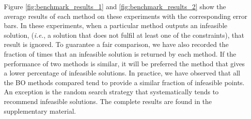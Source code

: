 \documentclass[review,preprint,12pt]{elsarticle}
\begin{document}
Figure \ref{fig:benchmark_results_1} and \ref{fig:benchmark_results_2} show the average results of each method on these 
experiments with the corresponding error bars. In these experiments, when a particular method outputs an infeasible solution, 
(\emph{i.e.}, a solution that does not fulfil at least one of the constraints), that result is ignored. To guarantee a 
fair comparison, we have also recorded the fraction of times that an infeasible solution is returned by each method. 
If the performance of two methods is similar, it will be preferred the method that gives a lower percentage of 
infeasible solutions. In practice, we have observed that all the BO methods compared tend to provide a similar 
fraction of infeasible points. An exception is the random search strategy that systematically tends to recommend 
infeasible solutions. The complete results are found in the supplementary material.
\end{document}
